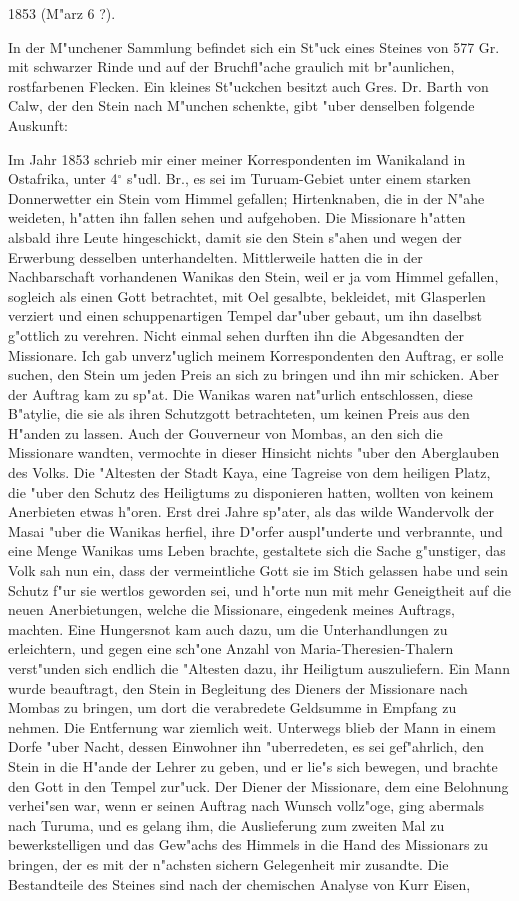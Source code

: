 \documentclass[a4paper, 11pt, oneside]{article}
\begin{document}
1853 (M"arz 6 ?).

In der M"unchener Sammlung befindet sich ein St"uck eines Steines von 577 Gr. mit schwarzer Rinde und auf der Bruchfl"ache graulich mit br"aunlichen, rostfarbenen Flecken. Ein kleines St"uckchen besitzt auch Gres. Dr. Barth von Calw, der den Stein nach M"unchen schenkte, gibt "uber denselben folgende Auskunft:

Im Jahr 1853 schrieb mir einer meiner Korrespondenten im Wanikaland in Ostafrika, unter 4$^\circ$ s"udl. Br., es sei im Turuam-Gebiet unter einem starken Donnerwetter ein Stein vom Himmel gefallen; Hirtenknaben, die in der N"ahe weideten, h"atten ihn fallen sehen und aufgehoben. Die Missionare h"atten alsbald ihre Leute hingeschickt, damit sie den Stein s"ahen und wegen der Erwerbung desselben unterhandelten. Mittlerweile hatten die in der Nachbarschaft vorhandenen Wanikas den Stein, weil er ja vom Himmel gefallen, sogleich als einen Gott betrachtet, mit Oel gesalbte, bekleidet, mit Glasperlen verziert und einen schuppenartigen Tempel dar"uber gebaut, um ihn daselbst g"ottlich zu verehren. Nicht einmal sehen durften ihn die Abgesandten der Missionare. Ich gab unverz"uglich meinem Korrespondenten den Auftrag, er solle suchen, den Stein um jeden Preis an sich zu bringen und ihn mir schicken. Aber der Auftrag kam zu sp"at. Die Wanikas waren nat"urlich entschlossen, diese B"atylie, die sie als ihren Schutzgott betrachteten, um keinen Preis aus den H"anden zu lassen. Auch der Gouverneur von Mombas, an den sich die Missionare wandten, vermochte in dieser Hinsicht nichts "uber den Aberglauben des Volks. Die "Altesten der Stadt Kaya, eine Tagreise von dem heiligen Platz, die "uber den Schutz des Heiligtums zu disponieren hatten, wollten von keinem Anerbieten etwas h"oren. Erst drei Jahre sp"ater, als das wilde Wandervolk der Masai "uber die Wanikas herfiel, ihre D"orfer auspl"underte und verbrannte, und eine Menge Wanikas ums Leben brachte, gestaltete sich die Sache g"unstiger, das Volk sah nun ein, dass der vermeintliche Gott sie im Stich gelassen habe und sein Schutz f"ur sie wertlos geworden sei, und h"orte nun mit mehr Geneigtheit auf die neuen Anerbietungen, welche die Missionare, eingedenk meines Auftrags, machten. Eine Hungersnot kam auch dazu, um die Unterhandlungen zu erleichtern, und gegen eine sch"one Anzahl von Maria-Theresien-Thalern verst"unden sich endlich die "Altesten dazu, ihr Heiligtum auszuliefern. Ein Mann wurde beauftragt, den Stein in Begleitung des Dieners der Missionare nach Mombas zu bringen, um dort die verabredete Geldsumme in Empfang zu nehmen. Die Entfernung war ziemlich weit. Unterwegs blieb der Mann in einem Dorfe "uber Nacht, dessen Einwohner ihn "uberredeten, es sei gef"ahrlich, den Stein in die H"ande der Lehrer zu geben, und er lie"s sich bewegen, und brachte den Gott in den Tempel zur"uck. Der Diener der Missionare, dem eine Belohnung verhei"sen war, wenn er seinen Auftrag nach Wunsch vollz"oge, ging abermals nach Turuma, und es gelang ihm, die Auslieferung zum zweiten Mal zu bewerkstelligen und das Gew"achs des Himmels in die Hand des Missionars zu bringen, der es mit der n"achsten sichern Gelegenheit mir zusandte. Die Bestandteile des Steines sind nach der chemischen Analyse von Kurr Eisen, 
\end{document}
